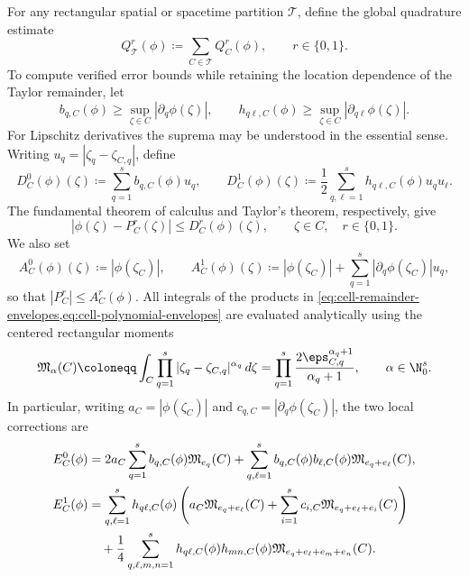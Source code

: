 For any rectangular spatial or spacetime partition $\mathcal T$, define the
global quadrature estimate
\begin{equation}\label{eq:partition-quadrature-rule}
  Q_{\mathcal T}^r(\phi)\coloneqq \sum_{C\in\mathcal T}Q_C^r(\phi),
  \qquad r\in\{0,1\}.
\end{equation}
To compute verified error bounds while retaining the location dependence of
the Taylor remainder, let
\begin{equation}\label{eq:cell-derivative-coefficients}
  b_{q,C}(\phi)\geq\sup_{\zeta\in C}|\partial_q\phi(\zeta)|,
  \qquad
  h_{q\ell,C}(\phi)\geq
  \sup_{\zeta\in C}|\partial_{q\ell}\phi(\zeta)|.
\end{equation}
For Lipschitz derivatives the suprema may be understood in the essential
sense.  Writing $u_q=|\zeta_q-\zeta_{C,q}|$, define
\begin{equation}\label{eq:cell-remainder-envelopes}
  D_C^0(\phi)(\zeta)
  \coloneqq\sum_{q=1}^s b_{q,C}(\phi)u_q,
  \qquad
  D_C^1(\phi)(\zeta)
  \coloneqq\frac12\sum_{q,\ell=1}^s
  h_{q\ell,C}(\phi)u_qu_\ell.
\end{equation}
The fundamental theorem of calculus and Taylor's theorem, respectively, give
\begin{equation}\label{eq:cell-model-errors}
  |\phi(\zeta)-P_C^r(\zeta)|\leq D_C^r(\phi)(\zeta),
  \qquad \zeta\in C,\quad r\in\{0,1\}.
\end{equation}
We also set
\begin{equation}\label{eq:cell-polynomial-envelopes}
  A_C^0(\phi)(\zeta)\coloneqq|\phi(\zeta_C)|,
  \qquad
  A_C^1(\phi)(\zeta)\coloneqq
  |\phi(\zeta_C)|+\sum_{q=1}^s
  |\partial_q\phi(\zeta_C)|u_q,
\end{equation}
so that $|P_C^r|\leq A_C^r(\phi)$.  All integrals of the products in
\cref{eq:cell-remainder-envelopes,eq:cell-polynomial-envelopes} are evaluated
analytically using the centered rectangular moments
\begin{equation}\label{eq:centered-cell-moments}
  \mathfrak M_\alpha(C)
  \coloneqq\int_C\prod_{q=1}^s
  |\zeta_q-\zeta_{C,q}|^{\alpha_q}\,d\zeta
  =\prod_{q=1}^s\frac{2\eps_{C,q}^{\alpha_q+1}}{\alpha_q+1},
  \qquad \alpha\in\N_0^s.
\end{equation}
In particular, writing
$a_C=|\phi(\zeta_C)|$ and
$c_{q,C}=|\partial_q\phi(\zeta_C)|$, the two local corrections are
\begin{align}
 E_C^0(\phi)
 &=2a_C\sum_{q=1}^s b_{q,C}(\phi)\mathfrak M_{e_q}(C)
 +\sum_{q,\ell=1}^s b_{q,C}(\phi)b_{\ell,C}(\phi)
 \mathfrak M_{e_q+e_\ell}(C),
 \label{eq:q0-cell-moment-correction}\\
 E_C^1(\phi)
 &=\sum_{q,\ell=1}^s h_{q\ell,C}(\phi)
 \left(a_C\mathfrak M_{e_q+e_\ell}(C)
 +\sum_{i=1}^s c_{i,C}\mathfrak M_{e_q+e_\ell+e_i}(C)\right)
 \notag\\
 &\quad+\frac14\sum_{q,\ell,m,n=1}^s
 h_{q\ell,C}(\phi)h_{mn,C}(\phi)
 \mathfrak M_{e_q+e_\ell+e_m+e_n}(C).
 \label{eq:q1-cell-moment-correction}
\end{align}
